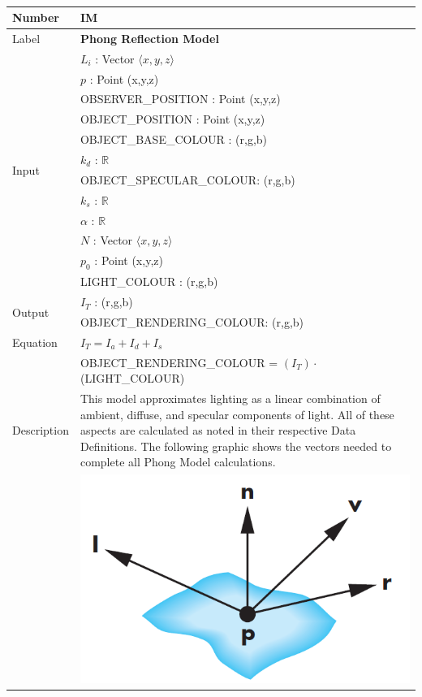 \documentclass[12pt]{article}
\newcommand{\colAwidth}{0.13\textwidth}
\newcommand{\colBwidth}{0.82\textwidth}
\newcounter{instnum} %
\begin{document}
~\newline

\noindent
\begin{minipage}{\textwidth}
	\renewcommand*{\arraystretch}{1.5}
	\begin{tabular}{| p{\colAwidth} | p{\colBwidth}|}
		\hline
		\rowcolor[gray]{0.9}
		Number& IM{instnum}\theinstnum \label{IM_Phong}\\
		\hline
		Label& \bf Phong Reflection Model\\
		\hline
		\multirow{12}{*}{Input} & $L_{i}$ : Vector $\langle x, y ,z \rangle$\\
		& $p$ : Point (x,y,z)\\
		& OBSERVER\_POSITION : Point (x,y,z)\\		
		& OBJECT\_POSITION : Point (x,y,z)\\
		& OBJECT\_BASE\_COLOUR : (r,g,b)\\
		& $k_{d}$ : $\mathbb{R}$\\
		& OBJECT\_SPECULAR\_COLOUR: (r,g,b)\\
		& $k_{s}$ : $\mathbb{R}$ \\
		& $\alpha$ : $\mathbb{R}$ \\
		& $N$ : Vector $\langle x, y ,z \rangle$\\
		& $p_{0}$ : Point (x,y,z)\\		
		& LIGHT\_COLOUR : (r,g,b)\\	
		\hline
		\multirow{2}{*}{Output} & $I_{T}$ : (r,g,b)\\
		& OBJECT\_RENDERING\_COLOUR: (r,g,b)\\
		\hline
		Equation & $I_{T} = I_{a} + I_{d} + I_{s}$\\
		& OBJECT\_RENDERING\_COLOUR = $(I_{T})\cdot$(LIGHT\_COLOUR)\\
		\hline
		Description& This model approximates lighting as a linear combination 
		of ambient, diffuse, and specular components of light. All of these 
		aspects are calculated as noted in their respective Data Definitions. 
		The following graphic shows the vectors needed to complete all Phong 
		Model calculations.\\
		& \includegraphics[scale=0.4]{./images/phong-reflection-model-vectors}\\

\end{tabular}
\end{minipage}
\end{document}
